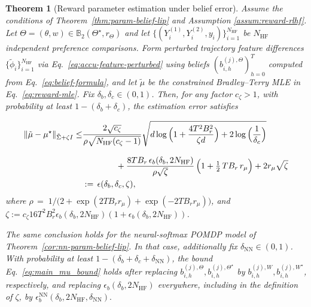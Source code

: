 \documentclass[10pt]{article} %
\theoremstyle{plain}
\newtheorem{theorem}{Theorem}[section]
\theoremstyle{definition}
\theoremstyle{remark}
\newcommand{\bB}{\mathbb{B}}
\begin{document}
\begin{theorem}[Reward parameter estimation under belief error]\label{thm:main-mu}
Assume the conditions of Theorem~\ref{thm:param-belief-lip} and Assumption \ref{assum:reward-rlhf}. Let $\Theta=(\theta,w)\in\bB_2(\Theta^\star,r_\Theta)$ and let
$\{(Y_i^{(1)},Y_i^{(2)},y_i)\}_{i=1}^{N_{\mathrm{HF}}}$ be $N_{\mathrm{HF}}$ independent preference comparisons. Form perturbed trajectory feature differences $\{\tilde\phi_i\}_{i=1}^{N_{\mathrm{HF}}}$ via Eq.~\ref{eq:accu-feature-perturbed}
using beliefs $(b_{i,h}^{(j),\Theta})_{h=0}^{T}$ computed from Eq.~\ref{eq:belief-formula}, and let
$\tilde\mu$ be the constrained Bradley--Terry MLE in Eq.~\ref{eq:reward-mle}.
Fix $\delta_b,\delta_c\in(0,1)$. Then, for any factor $c_{\zeta}>1$, with probability at least $1-(\delta_b+\delta_c)$,
the estimation error satisfies

\begin{align}
\|\tilde\mu-\mu^\star\|_{\tilde\Sigma+\zeta I}
\le &\frac{2\sqrt{c_{\zeta}}}{\rho\sqrt{N_{\mathrm{HF}}(c_{\zeta}-1)}}\sqrt{d\log \Big(1+\frac{4T^2 B_r^2}{\zeta d}\Big)+2\log \Big(\frac{1}{\delta_c}\Big)} \notag\\[8pt]
&\qquad\qquad+ \frac{8T B_r\,\epsilon_b(\delta_b, 2N_{\mathrm{HF}})}{\rho\sqrt{\zeta }}\, \Bigl(1+\tfrac12\,T B_r\,r_\mu\Bigr)+2r_\mu\sqrt{\zeta }\\
&:=\,\epsilon(\delta_b,\delta_c,\zeta),
\label{eq:main_mu_bound}
\end{align}
where $\rho\,=\;1/\big(2+\exp(2T B_r r_\mu)+\exp(-2T B_r r_\mu)\big)$, and $\zeta:=c_{\zeta} 16T^2B_r^2\epsilon_b(\delta_b, 2N_{\mathrm{HF}})(1+\epsilon_b(\delta_b, 2N_{\mathrm{HF}}))$.

The same conclusion holds for the neural-softmax POMDP model of
Theorem~\ref{cor:nn-param-belief-lip}. In that case, additionally fix \(\delta_{\mathrm{NN}}\in(0,1)\). With probability at least
\(1-(\delta_b+\delta_c+\delta_{\mathrm{NN}})\), the bound
Eq.~\ref{eq:main_mu_bound} holds after replacing
\(b_{i,h}^{(j),\Theta},b_{i,h}^{(j),\Theta^\star}\) by
\(b_{i,h}^{(j),W},b_{i,h}^{(j),W^\star}\), respectively, and replacing
\(\epsilon_b(\delta_b,2N_{\mathrm{HF}})\) everywhere, including in the definition of
\(\zeta\), by \(
\epsilon_b^{\mathrm{NN}}(\delta_b,2N_{\mathrm{HF}},\delta_{\mathrm{NN}}).
\)

\end{theorem}
\end{document}

